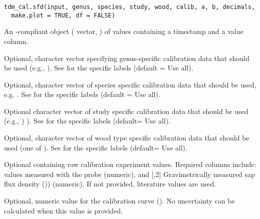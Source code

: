 \documentclass[a4paper]{book}
\begin{document}
%
\begin{Usage}
\begin{verbatim}
tdm_cal.sfd(input, genus, species, study, wood, calib, a, b, decimals,
  make.plot = TRUE, df = FALSE)
\end{verbatim}
\end{Usage}
%
\begin{Arguments}
\begin{ldescription}
\item[\code{input}] An -compliant object ( vector,
) of  values containing a timestamp and a value column.

\item[\code{genus}] Optional, character vector specifying genus-specific calibration
data that should be used (e.g., ). See 
for the specific labels (default = Use all).

\item[\code{species}] Optional, character vector of species specific calibration data that should be used,
e.g. . See  for the specific labels (default = Use all).

\item[\code{study}] Optional character vector of study specific calibration data that
should be used (e.g., ) ). See 
for the specific labels (default= Use all).

\item[\code{wood}] Optional, character vector of wood type specific calibration
data that should be used (one of ).
See  for the specific labels (default= Use all).

\item[\code{calib}] Optional  containing raw calibration experiment values.
Required columns include: \code{[ ,1]}  values measured with the probe (numeric),
and [,2]  Gravimetrically measured sap flux density ()) (numeric).
If not provided, literature values are used.

\item[\code{a}] Optional, numeric value for the calibration curve ().
No uncertainty can be calculated when this value is provided.


\end{ldescription}
\end{Arguments}
\end{document}
